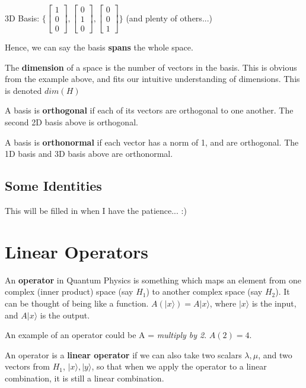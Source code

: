 \documentclass[12pt]{article}
\begin{document}
3D Basis: $\{\begin{bmatrix} 1 \\ 0 \\ 0\end{bmatrix}, \begin{bmatrix} 0 \\ 1 \\ 0\end{bmatrix}, \begin{bmatrix} 0 \\ 0 \\ 1\end{bmatrix}\}$ (and plenty of others...)

Hence, we can say the basis \textbf{spans} the whole space. 

The \textbf{dimension} of a space is the number of vectors in the basis. This is obvious from the example above, and fits our intuitive understanding of dimensions. This is denoted $dim(H)$

A basis is \textbf{orthogonal} if each of its vectors are orthogonal to one another. The second 2D basis above is orthogonal.

A basis is \textbf{orthonormal} if each vector has a norm of 1, and are orthogonal. The 1D basis and 3D basis above are orthonormal.

\subsection{Some Identities}

This will be filled in when I have the patience... :) \pagebreak

\section{Linear Operators}
An \textbf{operator} in Quantum Physics is something which maps an element from one complex (inner product) space (say $H_1$) to another complex space (say $H_2$). It can be thought of being like a function. $A(\lvert x \rangle) = A \lvert x \rangle$, where $\lvert x \rangle$ is the input, and $A\lvert x \rangle$ is the output.

An example of an operator could be A = \textit{multiply by 2}. $A(2) = 4$.

An operator is a \textbf{linear operator} if we can also take two scalars $\lambda, \mu$, and two vectors from $H_1$, $\lvert x \rangle, \lvert y \rangle$, so that when we apply the operator to a linear combination, it is still a linear combination. 
\end{document}
